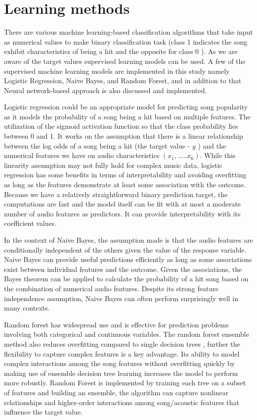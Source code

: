 \documentclass{article}
\begin{document}
\section{Learning methods}
There are various machine learning-based classification algorithms that take input as numerical values to make binary classification task (class 1 indicates the song exhibit characteristics of being a hit and the opposite for class 0 ). As we are aware of the target values supervised learning models can be used. A few of the supervised machine learning models are implemented in this study namely Logistic Regression, Naive Bayes, and Random Forest, and in addition to that Neural network-based approach is also discussed and implemented.

Logistic regression could be an appropriate model for predicting song popularity as it models the probability of a song being a hit based on multiple features. The utilization of the sigmoid activation function so that the class probability lies between 0 and 1. It works on the assumption that there is a linear relationship between the log odds of a song being a hit (the target value - $y$ ) and the numerical features we have on audio characteristics $(x_{1},.....x_{6})$.  While this linearity assumption may not fully hold for complex music data, logistic regression has some benefits in terms of interpretability and avoiding overfitting as long as the features demonstrate at least some association with the outcome. Because we have a relatively straightforward binary prediction target, the computations are fast and the model itself can be fit with at most a moderate number of audio features as predictors. It can provide interpretability with its coefficient values\cite{Schielzeth2010SimpleMT}.

In the context of Naive Bayes, the assumption made is that the audio features are conditionally independent of the others given the value of the response variable. Naive Bayes can provide useful predictions efficiently as long as some associations exist between individual features and the outcome. Given the associations, the Bayes theorem can be applied to calculate the probability of a hit song based on the combination of numerical audio features. Despite its strong feature independence assumption, Naive Bayes can often perform surprisingly well in many contexts\cite{Zhang2004TheOO}. 

Random forest has widespread use and is effective for prediction problems involving both categorical and continuous variables. The random forest ensemble method also reduces overfitting compared to single decision trees \cite{Dedja2022ExplainingRF}, further the flexibility to capture complex features is a key advantage. Its ability to model complex interactions among the song features without overfitting quickly by making use of ensemble decision tree learning increases the model to perform more robustly. Random Forest is implemented by training each tree on a subset of features and building an ensemble, the algorithm can capture nonlinear relationships and higher-order interactions among song/acoustic features that influence the target value.
\end{document}
